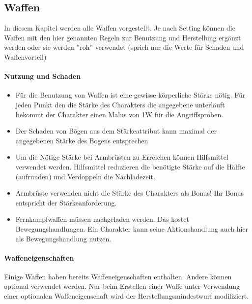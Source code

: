\documentclass{article}
\begin{document}
\begin{center}
\subsection{Waffen}
\end{center}

In diesem Kapitel werden alle Waffen vorgestellt. Je nach Setting können die Waffen mit den hier genannten Regeln
zur Benutzung und Herstellung ergänzt werden oder sie werden ''roh'' verwendet (sprich nur die Werte für Schaden und
Waffenvorteil)

\paragraph{Nutzung und Schaden}

\begin{itemize}
\item Für die Benutzung von Waffen ist eine gewisse körperliche Stärke nötig. Für jeden Punkt den die Stärke des Charakters die angegebene unterläuft bekommt der Charakter einen Malus von 1W für die Angriffsproben.
\item Der Schaden von Bögen aus dem Stärkeattribut kann maximal der angegebenen Stärke des Bogens entsprechen
\item Um die Nötige Stärke bei Armbrüsten zu Erreichen können Hilfsmittel verwendet werden. Hilfsmittel reduzieren die benötigte Stärke auf die Hälfte (aufrunden) und Verdoppeln die Nachladezeit.
\item Armbrüste verwenden nicht die Stärke des Charakters als Bonus! Ihr Bonus entspricht der Stärkeanforderung.
\item Fernkampfwaffen müssen nachgeladen werden. Das kostet Bewegungshandlungen. Ein Charakter kann seine Aktionshandlung auch hier als Bewegungshandlung nutzen.
\end{itemize}

\paragraph{Waffeneigenschaften}

Einige Waffen haben bereits Waffeneigenschaften enthalten. Andere können optional verwendet werden. Nur beim
Erstellen einer Waffe unter Verwendung einer optionalen Waffeneigenschaft wird der Herstellungsmindestwurf modifiziert.
\end{document}
